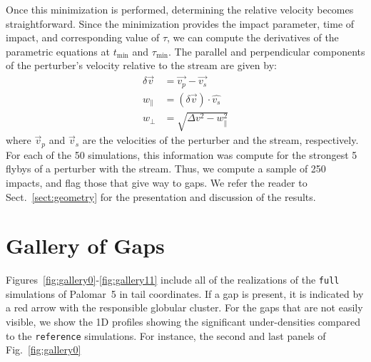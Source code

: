 \documentclass[draft]{aa}
\begin{document}
\begin{appendix}
      Once this minimization is performed, determining the relative velocity becomes straightforward. Since the minimization provides the impact parameter, time of impact, and corresponding value of $\tau$, we can compute the derivatives of the parametric equations at $t_{\text{min}}$ and $\tau_{\text{min}}$. The parallel and perpendicular components of the perturber's velocity relative to the stream are given by:
      \begin{equation}
        \begin{aligned}
          \delta \vec{v} &=\vec{v_p} - \vec{v_s} \\
          w_\parallel &= \left(\delta \vec{v}\right)\cdot \hat{v_s}\\  
          w_\perp &=  \sqrt{\Delta v ^2 - w_\parallel ^ 2}
          \end{aligned}
        \end{equation}
      where $\vec{v}_p$ and $\vec{v}_s$ are the velocities of the perturber and the stream, respectively. For each of the 50 simulations, this information was compute for the strongest 5 flybys of a perturber with the stream. Thus, we compute a sample of 250 impacts, and flag those that give way to gaps. We refer the reader to Sect.~\ref{sect:geometry} for the presentation and discussion of the results.




  \section{Gallery of Gaps} \label{sec:gallery_of_gaps}
    Figures~\ref{fig:gallery0}-\ref{fig:gallery11} include all of the realizations of the \texttt{full} simulations of Palomar~5 in tail coordinates. If a gap is present, it is indicated by a red arrow with the responsible globular cluster. For the gaps that are not easily visible, we show the 1D profiles  showing the significant under-densities compared to the \texttt{reference} simulations. For instance, the second and last panels of Fig.~\ref{fig:gallery0}


\end{appendix}
\end{document}
